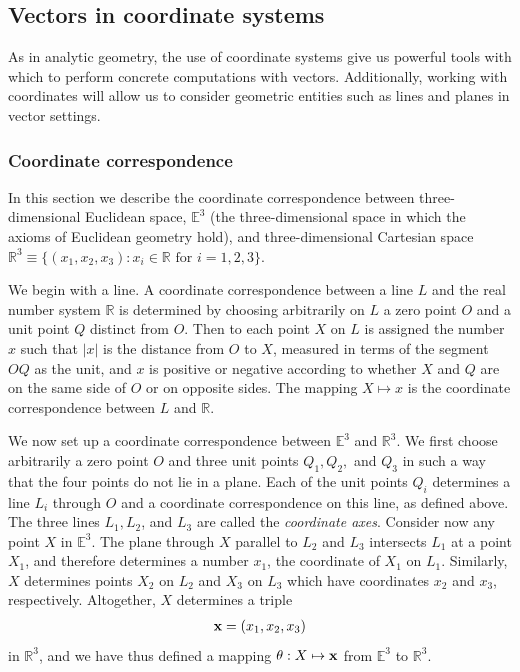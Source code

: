 \documentclass[12pt,letterpaper,reqno]{article}
\numberwithin{equation}{section}
\newcommand{\ti}[1]{\textit{#1}}
\begin{document}
\subsection{Vectors in coordinate systems}
As in analytic geometry, the use of coordinate systems give us powerful tools with which to perform concrete computations with vectors. Additionally, working with coordinates will allow us to consider geometric entities such as lines and planes in vector settings. 

\subsubsection{Coordinate correspondence}
In this section we describe the coordinate correspondence between three-dimensional Euclidean space, $\mathbb{E}^3$ (the three-dimensional space in which the axioms of Euclidean geometry hold), and three-dimensional Cartesian space $\mathbb{R}^3\equiv \{(x_1,x_2,x_3):x_i \in \mathbb{R} \text{ for } i=1,2,3\}$.

We begin with a line. A coordinate correspondence between a line $L$ and the real number system $\mathbb{R}$ is determined by choosing arbitrarily on $L$ a zero point $O$ and a unit point $Q$ distinct from $O$. Then to each point $X$ on $L$ is assigned the number $x$ such that $|x|$ is the distance from $O$ to $X$, measured in terms of the segment $OQ$ as the unit, and $x$ is positive or negative according to whether $X$ and $Q$ are on the same side of $O$ or on opposite sides. The mapping $X \mapsto x$ is the coordinate correspondence between $L$ and $\mathbb{R}$. 

We now set up a coordinate correspondence between $\mathbb{E}^3$ and $\mathbb{R}^3$. We first choose arbitrarily a zero point $O$ and three unit points $Q_1, Q_2,$ and $Q_3$ in such a way that the four points do not lie in a plane. Each of the unit points $Q_i$ determines a line $L_i$ through $O$ and a coordinate correspondence on this line, as defined above. The three lines $L_1, L_2$, and $L_3$ are called the \ti{coordinate axes}. Consider now any point $X$ in $\mathbb{E}^3$. The plane through $X$ parallel to $L_2$ and $L_3$ intersects $L_1$ at a point $X_1$, and therefore determines a number $x_1$, the coordinate of $X_1$ on $L_1$. Similarly, $X$ determines points $X_2$ on $L_2$ and $X_3$ on $L_3$ which have coordinates $x_2$ and $x_3$, respectively. Altogether, $X$ determines a triple
\begin{align*}
	{\bf x}=(x_1,x_2,x_3)
\end{align*} 
in $\mathbb{R}^3$, and we have thus defined a mapping $\theta:X \mapsto {\bf x}$ from $\mathbb{E}^3$ to $\mathbb{R}^3$. 
\end{document}
